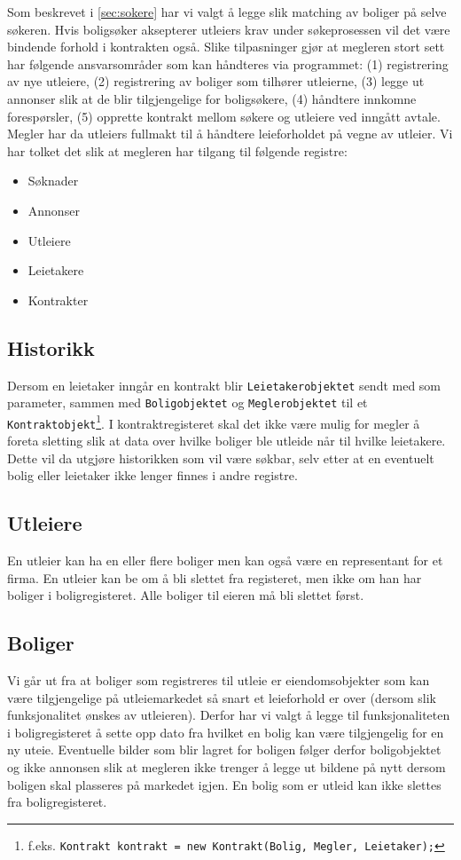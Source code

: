 Som beskrevet i \ref{sec:sokere} har vi valgt å legge slik matching av boliger på selve søkeren. Hvis boligsøker aksepterer utleiers krav under søkeprosessen vil det være bindende forhold i kontrakten også. Slike tilpasninger gjør at megleren stort sett har følgende ansvarsområder som kan håndteres via programmet: (1) registrering av nye utleiere, (2) registrering av boliger som tilhører utleierne, (3) legge ut annonser slik at de blir tilgjengelige for boligsøkere, (4) håndtere innkomne forespørsler, (5) opprette kontrakt mellom søkere og utleiere ved inngått avtale. Megler har da utleiers fullmakt til å håndtere leieforholdet på vegne av utleier. 
Vi har tolket det slik at megleren har tilgang til følgende registre:
\begin{itemize}
\item Søknader
\item Annonser
\item Utleiere
\item Leietakere
\item Kontrakter
\end{itemize}

\subsection{Historikk}
Dersom en leietaker inngår en kontrakt blir \texttt{Leietakerobjektet} sendt med som parameter, sammen med \texttt{Boligobjektet} og \texttt{Meglerobjektet} til et \texttt{Kontraktobjekt}\footnote{f.eks. \texttt{Kontrakt kontrakt = new Kontrakt(Bolig, Megler, Leietaker);}}. I kontraktregisteret skal det ikke være mulig for megler å foreta sletting slik at data over hvilke boliger ble utleide når til hvilke leietakere. Dette vil da utgjøre historikken som vil være søkbar, selv etter at en eventuelt bolig eller leietaker ikke lenger finnes i andre registre.

\subsection{Utleiere}
En utleier kan ha en eller flere boliger men kan også være en representant for et firma. En utleier kan be om å bli slettet fra registeret, men ikke om han har boliger i boligregisteret. Alle boliger til eieren må bli slettet først.

\subsection{Boliger}
Vi går ut fra at boliger som registreres til utleie er eiendomsobjekter som kan være tilgjengelige på utleiemarkedet så snart et leieforhold er over (dersom slik funksjonalitet ønskes av utleieren). Derfor har vi valgt å legge til funksjonaliteten i boligregisteret å sette opp dato fra hvilket en bolig kan være tilgjengelig for en ny uteie. Eventuelle bilder som blir lagret for boligen følger derfor boligobjektet og ikke annonsen slik at megleren ikke trenger å legge ut bildene på nytt dersom boligen skal plasseres på markedet igjen. En bolig som er utleid kan ikke slettes fra boligregisteret.

